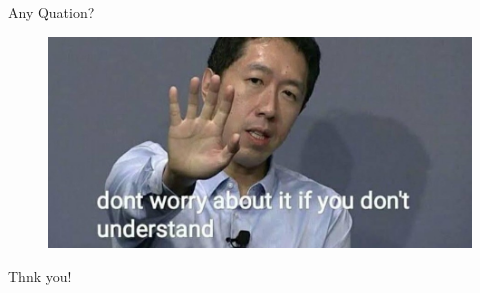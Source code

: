 \documentclass{beamer}
\begin{document}
	\begin{frame}{Any Quation?}
		\begin{figure}
			\includegraphics[scale=0.3]{ng.jpg}
		\end{figure}
	\end{frame}
	\begin{frame}[standout]
		Thnk you!
	\end{frame}
\end{document}
